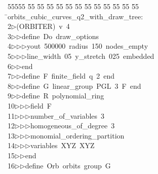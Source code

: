 %
%
\begin{tabbing}
55555 \= 55 \= 55 \= 55 \= 55 \= 55 \= 55 \= 55 \= 55 \= 55 \= 55 \= 55 \= 55 \= \>orbits\_cubic\_curves\_q2\_with\_draw\_tree:\\[0pt]
2\>$\triangleright$\>(ORBITER)\ v\ 4\ \\[0pt]
3\>$\triangleright$\>$\triangleright$\>define\ Do\ draw\_options\ \\[0pt]
4\>$\triangleright$\>$\triangleright$\>$\triangleright$\>yout\ 500000\ radius\ 150\ nodes\_empty\ \\[0pt]
5\>$\triangleright$\>$\triangleright$\>$\triangleright$\>line\_width\ 05\ y\_stretch\ 025\ embedded\ \\[0pt]
6\>$\triangleright$\>$\triangleright$\>end\ \\[0pt]
7\>$\triangleright$\>$\triangleright$\>define\ F\ finite\_field\ q\ 2\ end\ \\[0pt]
8\>$\triangleright$\>$\triangleright$\>define\ G\ linear\_group\ PGL\ 3\ F\ end\ \\[0pt]
9\>$\triangleright$\>$\triangleright$\>define\ R\ polynomial\_ring\ \\[0pt]
10\>$\triangleright$\>$\triangleright$\>$\triangleright$\>field\ F\ \\[0pt]
11\>$\triangleright$\>$\triangleright$\>$\triangleright$\>number\_of\_variables\ 3\ \\[0pt]
12\>$\triangleright$\>$\triangleright$\>$\triangleright$\>homogeneous\_of\_degree\ 3\ \\[0pt]
13\>$\triangleright$\>$\triangleright$\>$\triangleright$\>monomial\_ordering\_partition\ \\[0pt]
14\>$\triangleright$\>$\triangleright$\>$\triangleright$\>variables\ XYZ\ XYZ\ \\[0pt]
15\>$\triangleright$\>$\triangleright$\>end\ \\[0pt]
16\>$\triangleright$\>$\triangleright$\>define\ Orb\ orbits\ group\ G\ \\[0pt]

\end{tabbing}
